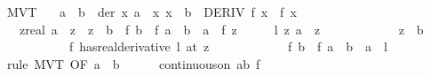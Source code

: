 \begin{isabellebody}
%
\isadelimproof
\isanewline
%
\endisadelimproof
\isanewline
{}\isamarkupfalse%
\ MVT{}{\isacharcolon}{\kern0pt}\isanewline
\ \ \ {\isachardoublequoteopen}a\ {\isacharless}{\kern0pt}\ b{\isachardoublequoteclose}\ \ der{\isacharcolon}{\kern0pt}\ {\isachardoublequoteopen}{\isasymAnd}x{\isachardot}{\kern0pt}\ {\isasymlbrakk}a\ {\isasymle}\ x{\isacharsemicolon}{\kern0pt}\ x\ {\isasymle}\ b{\isasymrbrakk}\ {\isasymLongrightarrow}\ DERIV\ f\ x\ {\isacharcolon}{\kern0pt}{\isachargreater}{\kern0pt}\ f{\isacharprime}{\kern0pt}\ x{\isachardoublequoteclose}\isanewline
\ \ \ {\isachardoublequoteopen}{\isasymexists}z{\isacharcolon}{\kern0pt}{\isacharcolon}{\kern0pt}real{\isachardot}{\kern0pt}\ a\ {\isacharless}{\kern0pt}\ z\ {\isasymand}\ z\ {\isacharless}{\kern0pt}\ b\ {\isasymand}\ {\isacharparenleft}{\kern0pt}f\ b\ {\isacharminus}{\kern0pt}\ f\ a\ {\isacharequal}{\kern0pt}\ {\isacharparenleft}{\kern0pt}b\ {\isacharminus}{\kern0pt}\ a{\isacharparenright}{\kern0pt}\ {\isacharasterisk}{\kern0pt}\ f{\isacharprime}{\kern0pt}\ z{\isacharparenright}{\kern0pt}{\isachardoublequoteclose}\isanewline
%
\isadelimproof
%
\endisadelimproof
%
\isatagproof
{}\isamarkupfalse%
\ {\isacharminus}{\kern0pt}\isanewline
\ \ \isamarkupfalse%
\ {\isachardoublequoteopen}{\isasymexists}l\ z{\isachardot}{\kern0pt}\ a\ {\isacharless}{\kern0pt}\ z\ {\isasymand}\isanewline
\ \ \ \ \ \ \ \ \ \ \ z\ {\isacharless}{\kern0pt}\ b\ {\isasymand}\isanewline
\ \ \ \ \ \ \ \ \ \ \ {\isacharparenleft}{\kern0pt}f\ has{\isacharunderscore}{\kern0pt}real{\isacharunderscore}{\kern0pt}derivative\ l{\isacharparenright}{\kern0pt}\ {\isacharparenleft}{\kern0pt}at\ z{\isacharparenright}{\kern0pt}\ {\isasymand}\isanewline
\ \ \ \ \ \ \ \ \ \ \ f\ b\ {\isacharminus}{\kern0pt}\ f\ a\ {\isacharequal}{\kern0pt}\ {\isacharparenleft}{\kern0pt}b\ {\isacharminus}{\kern0pt}\ a{\isacharparenright}{\kern0pt}\ {\isacharasterisk}{\kern0pt}\ l{\isachardoublequoteclose}\isanewline
\ \ \isamarkupfalse%
\ {\isacharparenleft}{\kern0pt}rule\ MVT\ {\isacharbrackleft}{\kern0pt}OF\ {\isacartoucheopen}a\ {\isacharless}{\kern0pt}\ b{\isacartoucheclose}{\isacharbrackright}{\kern0pt}{\isacharparenright}{\kern0pt}\isanewline
\ \ \ \ \isamarkupfalse%
\ {\isachardoublequoteopen}continuous{\isacharunderscore}{\kern0pt}on\ {\isacharbraceleft}{\kern0pt}a{\isachardot}{\kern0pt}{\isachardot}{\kern0pt}b{\isacharbraceright}{\kern0pt}\ f{\isachardoublequoteclose}\isanewline
\ \ \ \ \ \ \isamarkupfalse%

\end{isabellebody}
